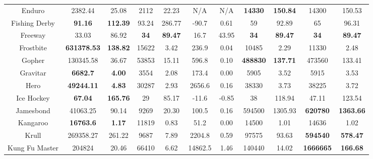 \documentclass[nohyperref]{article}
\newcommand{\best}[1]{\textbf{#1}}
\theoremstyle{plain}
\begin{document}
\begin{table}[!hb]
\begin{center}
\begin{tabular}{| c |c c| c c| c c| c c| c c| }
 Enduro             & 2382.44                 & 25.08       & 2112              &22.23         & N/A               & N/A     & \best{14330} & \best{150.84}&14300             &150.53   \\
 Fishing Derby      & \textbf{91.16}          & \textbf{112.39     }              &93.24          &286.77      &-90.7     & 0.61    & 59          & 92.89  &65               &96.31        \\
 Freeway            & 33.03                   & 86.92       & \textbf{34}                 &\textbf{89.47}          &16.7               & 43.95   & \best{34}      & \best{89.47} &\textbf{34}               &\textbf{89.47}   \\
 Frostbite          & \textbf{631378.53}      & \textbf{138.82}     & 15622    &3.42       &236.9     & 0.04    & 10485       & 2.29                           &11330            &2.48\\
 Gopher             & 130345.58               & 36.67      & 53853             &15.11         &596.8              & 0.10       & \best{488830} & \best{137.71} &473560           &133.41  \\
 Gravitar           & \textbf{6682.7     }    & \textbf{4.00    }  & 3554     &2.08      &173.4     & 0.00    & 5905        & 3.52     &5915             &3.53       \\
 Hero               & \textbf{49244.11}       & \textbf{4.83    }  & 30287    &2.93      &2656.6    & 0.16        & 38330       & 3.73 &38225            &3.72           \\
 Ice Hockey         & \textbf{67.04      }    & \textbf{165.76  }  & 29        &85.17         &-11.6     & -0.85       & 38          & 118.94 &47.11           &123.54         \\
 Jamesbond          & 41063.25                & 90.14     & 9269              &20.30         &100.5     & 0.16    &594500              &1305.93 &\textbf{620780}          &\textbf{ 1363.66}  \\
 Kangaroo           & \textbf{16763.6        }& \textbf{1.17}  & 11819     &0.83      &51.2      & 0.00    & 14500       & 1.01          &14636           &1.02   \\
 Krull              & 269358.27               & 261.22     & 9687     &7.89       &2204.8    & 0.59    & 97575       & 93.63    &\textbf{594540}          &\textbf{578.47}       \\
 Kung Fu Master     & 204824         & 20.46  & 66410    &6.62       &14862.5   & 1.46    & 140440      & 14.02        &\textbf{1666665}          &\textbf{166.68 } \\

\end{tabular}
\end{center}
\end{table}
\end{document}
